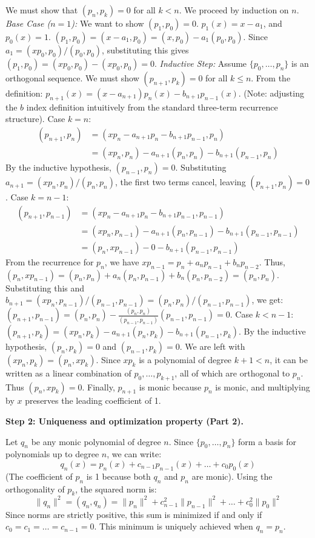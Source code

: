 \begin{solution}
We must show that $(p_n, p_k) = 0$ for all $k < n$. We proceed by induction on $n$.
\textit{Base Case ($n=1$):} We want to show $(p_1, p_0) = 0$. 
$p_1(x) = x - a_1$, and $p_0(x) = 1$.
$(p_1, p_0) = (x - a_1, p_0) = (x, p_0) - a_1(p_0, p_0)$.
Since $a_1 = (x p_0, p_0) / (p_0, p_0)$, substituting this gives $(p_1, p_0) = (x p_0, p_0) - (x p_0, p_0) = 0$.
\textit{Inductive Step:} Assume $\{p_0, \dots, p_n\}$ is an orthogonal sequence. We must show $(p_{n+1}, p_k) = 0$ for all $k \leq n$.
From the definition: $p_{n+1}(x) = (x - a_{n+1}) p_n(x) - b_{n+1} p_{n-1}(x)$. (Note: adjusting the $b$ index definition intuitively from the standard three-term recurrence structure).
Case $k = n$:
\begin{align*}
(p_{n+1}, p_n) &= (x p_n - a_{n+1} p_n - b_{n+1} p_{n-1}, p_n) \\
&= (x p_n, p_n) - a_{n+1}(p_n, p_n) - b_{n+1}(p_{n-1}, p_n)
\end{align*}
By the inductive hypothesis, $(p_{n-1}, p_n) = 0$. Substituting $a_{n+1} = (x p_n, p_n) / (p_n, p_n)$, the first two terms cancel, leaving $(p_{n+1}, p_n) = 0$.
Case $k = n-1$:
\begin{align*}
(p_{n+1}, p_{n-1}) &= (x p_n - a_{n+1} p_n - b_{n+1} p_{n-1}, p_{n-1}) \\
&= (x p_n, p_{n-1}) - a_{n+1}(p_n, p_{n-1}) - b_{n+1}(p_{n-1}, p_{n-1}) \\
&= (p_n, x p_{n-1}) - 0 - b_{n+1}(p_{n-1}, p_{n-1})
\end{align*}
From the recurrence for $p_n$, we have $x p_{n-1} = p_n + a_n p_{n-1} + b_n p_{n-2}$.
Thus, $(p_n, x p_{n-1}) = (p_n, p_n) + a_n(p_n, p_{n-1}) + b_n(p_n, p_{n-2}) = (p_n, p_n)$.
Substituting this and $b_{n+1} = (x p_n, p_{n-1}) / (p_{n-1}, p_{n-1}) = (p_n, p_n) / (p_{n-1}, p_{n-1})$, we get:
$(p_{n+1}, p_{n-1}) = (p_n, p_n) - \frac{(p_n, p_n)}{(p_{n-1}, p_{n-1})}(p_{n-1}, p_{n-1}) = 0$.
Case $k < n-1$:
$(p_{n+1}, p_k) = (x p_n, p_k) - a_{n+1}(p_n, p_k) - b_{n+1}(p_{n-1}, p_k)$.
By the inductive hypothesis, $(p_n, p_k) = 0$ and $(p_{n-1}, p_k) = 0$.
We are left with $(x p_n, p_k) = (p_n, x p_k)$. Since $x p_k$ is a polynomial of degree $k+1 < n$, it can be written as a linear combination of $p_0, \dots, p_{k+1}$, all of which are orthogonal to $p_n$. Thus $(p_n, x p_k) = 0$.
Finally, $p_{n+1}$ is monic because $p_n$ is monic, and multiplying by $x$ preserves the leading coefficient of 1.

\textbf{Step 2: Uniqueness and optimization property (Part 2).}

Let $q_n$ be any monic polynomial of degree $n$. Since $\{p_0, \dots, p_n\}$ form a basis for polynomials up to degree $n$, we can write:
\[ q_n(x) = p_n(x) + c_{n-1} p_{n-1}(x) + \dots + c_0 p_0(x) \]
(The coefficient of $p_n$ is 1 because both $q_n$ and $p_n$ are monic).
Using the orthogonality of $p_k$, the squared norm is:
\[ \|q_n\|^2 = (q_n, q_n) = \|p_n\|^2 + c_{n-1}^2 \|p_{n-1}\|^2 + \dots + c_0^2 \|p_0\|^2 \]
Since norms are strictly positive, this sum is minimized if and only if $c_0 = c_1 = \dots = c_{n-1} = 0$.
This minimum is uniquely achieved when $q_n = p_n$.


\end{solution}
